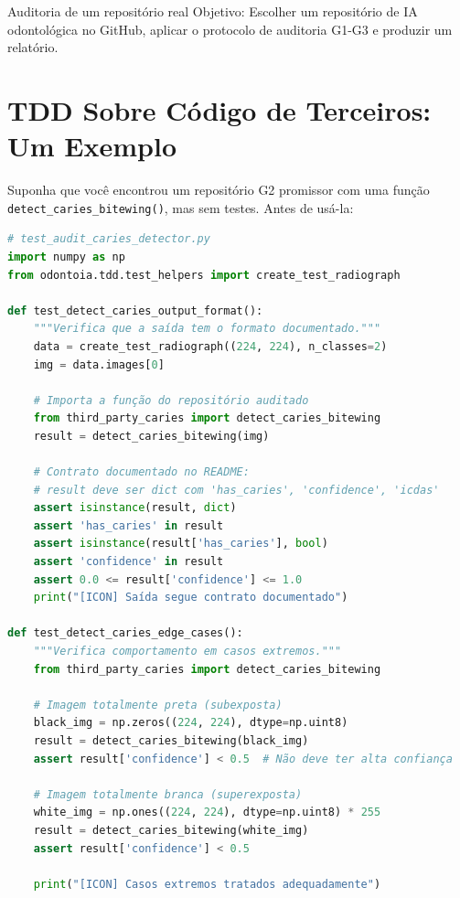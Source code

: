 \begin{pratica}{Auditoria de um repositório real}
  Objetivo: Escolher um repositório de IA odontológica no GitHub, aplicar
  o protocolo de auditoria G1-G3 e produzir um relatório.
\end{pratica}



\section{TDD Sobre Código de Terceiros: Um Exemplo}

Suponha que você encontrou um repositório G2 promissor com uma função
\texttt{detect\_caries\_bitewing()}, mas sem testes. Antes de usá-la:

\begin{lstlisting}[language=Python, caption=TDD sobre código de terceiros — etapa RED]
# test_audit_caries_detector.py
import numpy as np
from odontoia.tdd.test_helpers import create_test_radiograph

def test_detect_caries_output_format():
    """Verifica que a saída tem o formato documentado."""
    data = create_test_radiograph((224, 224), n_classes=2)
    img = data.images[0]

    # Importa a função do repositório auditado
    from third_party_caries import detect_caries_bitewing
    result = detect_caries_bitewing(img)

    # Contrato documentado no README:
    # result deve ser dict com 'has_caries', 'confidence', 'icdas'
    assert isinstance(result, dict)
    assert 'has_caries' in result
    assert isinstance(result['has_caries'], bool)
    assert 'confidence' in result
    assert 0.0 <= result['confidence'] <= 1.0
    print("[ICON] Saída segue contrato documentado")

def test_detect_caries_edge_cases():
    """Verifica comportamento em casos extremos."""
    from third_party_caries import detect_caries_bitewing

    # Imagem totalmente preta (subexposta)
    black_img = np.zeros((224, 224), dtype=np.uint8)
    result = detect_caries_bitewing(black_img)
    assert result['confidence'] < 0.5  # Não deve ter alta confiança

    # Imagem totalmente branca (superexposta)
    white_img = np.ones((224, 224), dtype=np.uint8) * 255
    result = detect_caries_bitewing(white_img)
    assert result['confidence'] < 0.5

    print("[ICON] Casos extremos tratados adequadamente")
\end{lstlisting}

